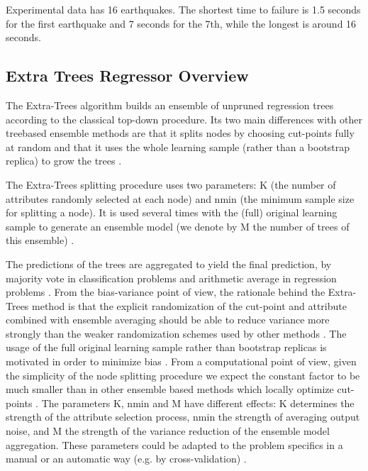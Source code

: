 \documentclass[]{llncs} %
\begin{document}
Experimental data has 16 earthquakes. The shortest time to failure is 1.5 seconds for the first earthquake and 7 seconds for the 7th, while the longest is around 16 seconds. \par

\subsection{Extra Trees Regressor Overview}
The Extra-Trees algorithm builds an ensemble of unpruned regression trees according to the classical top-down procedure. Its two main differences with other treebased ensemble methods are that it splits nodes by choosing cut-points fully at random and that it uses the whole learning sample (rather than a bootstrap replica) to grow the trees \cite{ExtremeRandomTrees}. \par

The Extra-Trees splitting procedure uses two parameters: K (the number of attributes randomly selected at each node) and nmin (the minimum sample size for splitting a node). It is used several times with the (full) original learning sample to generate an ensemble model (we denote by M the number of trees of this ensemble) \cite{ExtremeRandomTrees}. 

The predictions of the trees are aggregated to yield the final prediction, by majority vote in classification problems and arithmetic average in regression problems \cite{ExtremeRandomTrees}. From the bias-variance point of view, the rationale behind the Extra-Trees method is that the explicit randomization of the cut-point and attribute combined with ensemble averaging should be able to reduce variance more strongly than the weaker randomization schemes used by other methods \cite{ExtremeRandomTrees}. The usage of the full original learning sample rather than bootstrap replicas is motivated in order to minimize bias \cite{ExtremeRandomTrees}. From a computational point of view, given the simplicity of the node splitting procedure we expect the constant factor to be much smaller than in other ensemble based methods which locally optimize cut-points \cite{ExtremeRandomTrees}. The parameters K, nmin and M have different effects: K determines the strength of the attribute selection process, nmin the strength of averaging output noise, and M the strength of the variance reduction of the ensemble model aggregation. These parameters could be adapted to the problem specifics in a manual or an automatic way (e.g. by cross-validation) \cite{ExtremeRandomTrees}. \par
\end{document}
